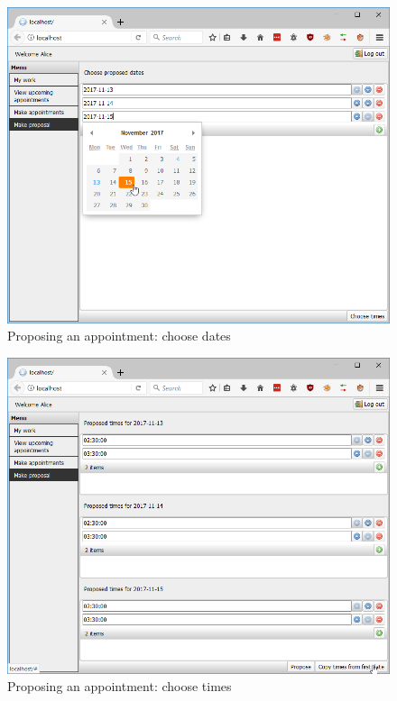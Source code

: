 \documentclass{article}
\begin{document}
	\begin{figure}[h!]
		\includegraphics[width=\textwidth]{05_make_proposal_choose_dates}
		\caption{Proposing an appointment: choose dates}
	\end{figure}
	
	\begin{figure}[h!]
		\includegraphics[width=\textwidth]{06_make_proposal_choose_times}
		\caption{Proposing an appointment: choose times}
	\end{figure}
	
\end{document}
